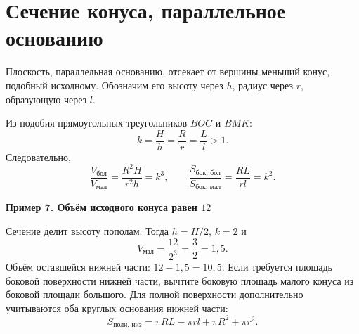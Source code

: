 \documentclass[a4paper,12pt]{article}
\newcommand{\sub}[1]{\par\medskip\textcolor{darkaccent}{\textbf{#1}}\par\smallskip}
\begin{document}
\section{Сечение конуса, параллельное основанию}
Плоскость, параллельная основанию, отсекает от вершины меньший конус, подобный исходному. Обозначим его высоту через $h$, радиус через $r$, образующую через $l$.
\begin{center}
\end{center}
Из подобия прямоугольных треугольников $BOC$ и $BMK$:
\[
k=\frac{H}{h}=\frac{R}{r}=\frac{L}{l}>1.
\]
Следовательно,
\[
\frac{V_{\text{бол}}}{V_{\text{мал}}}=\frac{R^2H}{r^2h}=k^3,
\qquad \frac{S_{\text{бок, бол}}}{S_{\text{бок, мал}}}=\frac{RL}{rl}=k^2.
\]
\sub{Пример 7. Объём исходного конуса равен $12$}
Сечение делит высоту пополам. Тогда $h=H/2$, $k=2$ и
\[
V_{\text{мал}}=\frac{12}{2^3}=\frac32=1{,}5.
\]
Объём оставшейся нижней части: $12-1{,}5=10{,}5$. Если требуется площадь боковой поверхности нижней части, вычтите боковую площадь малого конуса из боковой площади большого. Для полной поверхности дополнительно учитываются оба круглых основания нижней части:\[
S_{\text{полн, низ}}=\pi RL-\pi rl+\pi R^2+\pi r^2.
\]
\clearpage
\end{document}

